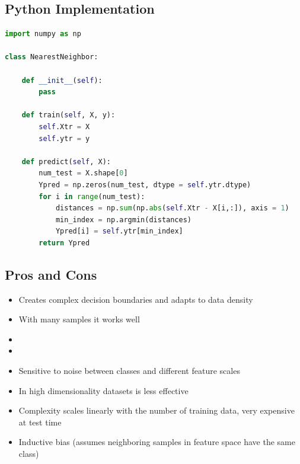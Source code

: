 \subsection{Python Implementation}
\begin{lstlisting}[language=Python]
import numpy as np

class NearestNeighbor:

    def __init__(self):
        pass

    def train(self, X, y):
        self.Xtr = X
        self.ytr = y

    def predict(self, X):
        num_test = X.shape[0]
        Ypred = np.zeros(num_test, dtype = self.ytr.dtype)
        for i in range(num_test):
            distances = np.sum(np.abs(self.Xtr - X[i,:]), axis = 1)
            min_index = np.argmin(distances)
            Ypred[i] = self.ytr[min_index]
        return Ypred
\end{lstlisting}

\subsection{Pros and Cons}
\begin{multicols}{2}
    \begin{itemize}
        \item Creates complex decision boundaries and adapts to data density
        \item With many samples it works well
        \item[] 
        \item[] 
    \end{itemize} 
    \columnbreak
    \begin{itemize}
        \item Sensitive to noise between classes and different feature scales
        \item In high dimensionality datasets is less effective
        \item Complexity scales linearly with the number of training data, very expensive at test time
        \item Inductive bias (assumes neighboring samples in feature space have the same class)
    \end{itemize}
\end{multicols}

\newpage
